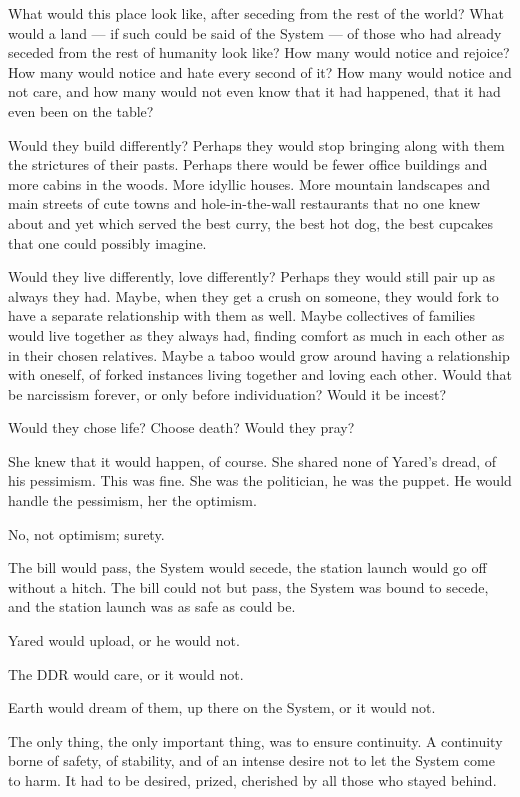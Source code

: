 What would this place look like, after seceding from the rest of the world? What would a land — if such could be said of the System — of those who had already seceded from the rest of humanity look like? How many would notice and rejoice? How many would notice and hate every second of it? How many would notice and not care, and how many would not even know that it had happened, that it had even been on the table?

Would they build differently? Perhaps they would stop bringing along with them the strictures of their pasts. Perhaps there would be fewer office buildings and more cabins in the woods. More idyllic houses. More mountain landscapes and main streets of cute towns and hole-in-the-wall restaurants that no one knew about and yet which served the best curry, the best hot dog, the best cupcakes that one could possibly imagine.

Would they live differently, love differently? Perhaps they would still pair up as always they had. Maybe, when they get a crush on someone, they would fork to have a separate relationship with them as well. Maybe collectives of families would live together as they always had, finding comfort as much in each other as in their chosen relatives. Maybe a taboo would grow around having a relationship with oneself, of forked instances living together and loving each other. Would that be narcissism forever, or only before individuation? Would it be incest?

Would they chose life? Choose death? Would they pray?

She knew that it would happen, of course. She shared none of Yared's dread, of his pessimism. This was fine. She was the politician, he was the puppet. He would handle the pessimism, her the optimism.

No, not optimism; surety.

The bill would pass, the System would secede, the station launch would go off without a hitch. The bill could not but pass, the System was bound to secede, and the station launch was as safe as could be.

Yared would upload, or he would not.

The DDR would care, or it would not.

Earth would dream of them, up there on the System, or it would not.

The only thing, the only important thing, was to ensure continuity. A continuity borne of safety, of stability, and of an intense desire not to let the System come to harm. It had to be desired, prized, cherished by all those who stayed behind.

